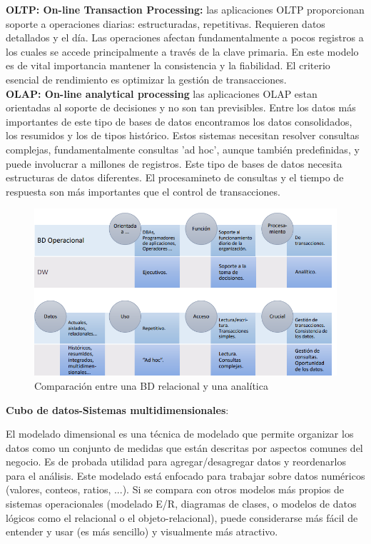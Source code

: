 \documentclass[a4paper,11pt]{article}
\begin{document}
\textbf{OLTP: On-line Transaction Processing:} las aplicaciones OLTP proporcionan soporte a operaciones diarias: estructuradas, repetitivas. Requieren datos detallados y el día. Las operaciones afectan fundamentalmente a pocos registros a los cuales se accede principalmente a través de la clave primaria. En este modelo es de vital importancia mantener la consistencia y la fiabilidad. El criterio esencial de rendimiento es optimizar la gestión de transacciones. \\

\textbf{OLAP: On-line analytical processing} las aplicaciones OLAP estan orientadas al soporte de decisiones y no son tan previsibles. Entre los datos más importantes de este tipo de bases de datos encontramos los datos consolidados, los resumidos y los de tipos histórico. Estos sistemas necesitan resolver consultas complejas, fundamentalmente consultas 'ad hoc', aunque también predefinidas, y puede involucrar a millones de registros. Este tipo de bases de datos necesita estructuras de datos diferentes. El procesamineto de consultas y el tiempo de respuesta son más importantes que el control de transacciones.

\begin{figure}[h]
\centering
\includegraphics[scale=1,width=1\textwidth]{comparacion.png}
\caption{Comparación entre una BD relacional y una analítica}
\end{figure}

\textbf{Cubo de datos-Sistemas multidimensionales}:

El modelado dimensional es una técnica de modelado que permite organizar los datos como un conjunto de medidas que están descritas por aspectos comunes del negocio. Es de probada utilidad para agregar/desagregar datos y reordenarlos para el análisis. Este modelado está enfocado para trabajar sobre datos numéricos (valores, conteos, ratios, ...). Si se compara con otros modelos más propios de sistemas operacionales (modelado E/R, diagramas de clases, o modelos de datos lógicos como el relacional o el objeto-relacional), puede considerarse más fácil de entender y usar (es más sencillo) y visualmente más atractivo.
\end{document}
